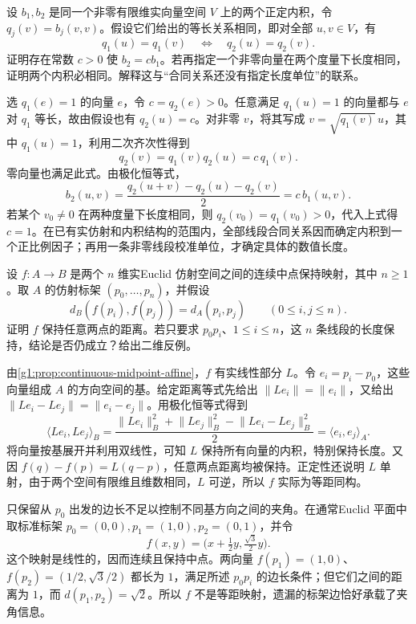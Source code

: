 \begin{exercise}\label{g1:ex:congruence-determines-scale}
	设 \(b_1,b_2\) 是同一个非零有限维实向量空间 \(V\) 上的两个正定内积，令 \(q_j(v)=b_j(v,v)\)。假设它们给出的等长关系相同，即对全部 \(u,v\in V\)，有
	\[
		q_1(u)=q_1(v)\quad\Longleftrightarrow\quad q_2(u)=q_2(v).
	\]
	证明存在常数 \(c>0\) 使 \(b_2=cb_1\)。若再指定一个非零向量在两个度量下长度相同，证明两个内积必相同。解释这与“合同关系还没有指定长度单位”的联系。
\end{exercise}
\begin{solution}
	选 \(q_1(e)=1\) 的向量 \(e\)，令 \(c=q_2(e)>0\)。任意满足 \(q_1(u)=1\) 的向量都与 \(e\) 对 \(q_1\) 等长，故由假设也有 \(q_2(u)=c\)。对非零 \(v\)，将其写成 \(v=\sqrt{q_1(v)}\,u\)，其中 \(q_1(u)=1\)，利用二次齐次性得到
	\[
		q_2(v)=q_1(v)q_2(u)=c\,q_1(v).
	\]
	零向量也满足此式。由极化恒等式，
	\[
		b_2(u,v)=\frac{q_2(u+v)-q_2(u)-q_2(v)}2
		=c\,b_1(u,v).
	\]
	若某个 \(v_0\ne0\) 在两种度量下长度相同，则 \(q_2(v_0)=q_1(v_0)>0\)，代入上式得 \(c=1\)。在已有实仿射和内积结构的范围内，全部线段合同关系因而确定内积到一个正比例因子；再用一条非零线段校准单位，才确定具体的数值长度。
\end{solution}

\begin{exercise}\label{g1:ex:frame-distances-rigidity}
	设 \(f:A\to B\) 是两个 \(n\) 维实Euclid 仿射空间之间的连续中点保持映射，其中 \(n\ge1\)。取 \(A\) 的仿射标架 \((p_0,\ldots,p_n)\)，并假设
	\[
		d_B(f(p_i),f(p_j))=d_A(p_i,p_j)\qquad(0\le i,j\le n).
	\]
	证明 \(f\) 保持任意两点的距离。若只要求 \(p_0p_i\)、\(1\le i\le n\)，这 \(n\) 条线段的长度保持，结论是否仍成立？给出二维反例。
\end{exercise}
\begin{solution}
	由\cref{g1:prop:continuous-midpoint-affine}，\(f\) 有实线性部分 \(L\)。令 \(e_i=p_i-p_0\)，这些向量组成 \(A\) 的方向空间的基。给定距离等式先给出 \(\lVert Le_i\rVert=\lVert e_i\rVert\)，又给出 \(\lVert Le_i-Le_j\rVert=\lVert e_i-e_j\rVert\)。用极化恒等式得到
	\[
		\langle Le_i,Le_j\rangle_B
		=\frac{\lVert Le_i\rVert_B^2+\lVert Le_j\rVert_B^2-\lVert Le_i-Le_j\rVert_B^2}{2}
		=\langle e_i,e_j\rangle_A.
	\]
	将向量按基展开并利用双线性，可知 \(L\) 保持所有向量的内积，特别保持长度。又因 \(f(q)-f(p)=L(q-p)\)，任意两点距离均被保持。正定性还说明 \(L\) 单射，由于两个空间有限维且维数相同，\(L\) 可逆，所以 \(f\) 实际为等距同构。

	只保留从 \(p_0\) 出发的边长不足以控制不同基方向之间的夹角。在通常Euclid 平面中取标准标架 \(p_0=(0,0),p_1=(1,0),p_2=(0,1)\)，并令
	\[
		f(x,y)=\bigl(x+\tfrac12y,\tfrac{\sqrt3}{2}y\bigr).
	\]
	这个映射是线性的，因而连续且保持中点。两向量 \(f(p_1)=(1,0)\)、\(f(p_2)=(1/2,\sqrt3/2)\) 都长为 \(1\)，满足所述 \(p_0p_i\) 的边长条件；但它们之间的距离为 \(1\)，而 \(d(p_1,p_2)=\sqrt2\)。所以 \(f\) 不是等距映射，遗漏的标架边恰好承载了夹角信息。
\end{solution}

